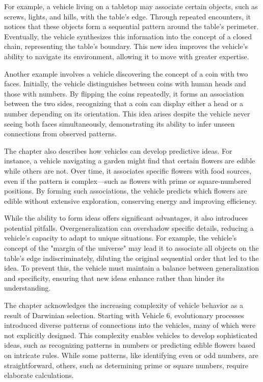 \documentclass{article}
\begin{document}
	For example, a vehicle living on a tabletop may associate certain objects, such as screws, lights, and hills, with the table's edge. Through repeated encounters, it notices that these objects form a sequential pattern around the table's perimeter. Eventually, the vehicle synthesizes this information into the concept of a closed chain, representing the table's boundary. This new idea improves the vehicle's ability to navigate its environment, allowing it to move with greater expertise.

	Another example involves a vehicle discovering the concept of a coin with two faces. Initially, the vehicle distinguishes between coins with human heads and those with numbers. By flipping the coins repeatedly, it forms an association between the two sides, recognizing that a coin can display either a head or a number depending on its orientation. This idea arises despite the vehicle never seeing both faces simultaneously, demonstrating its ability to infer unseen connections from observed patterns.

	The chapter also describes how vehicles can develop predictive ideas. For instance, a vehicle navigating a garden might find that certain flowers are edible while others are not. Over time, it associates specific flowers with food sources, even if the pattern is complex—such as flowers with prime or square-numbered positions. By forming such associations, the vehicle predicts which flowers are edible without extensive exploration, conserving energy and improving efficiency.

	While the ability to form ideas offers significant advantages, it also introduces potential pitfalls. Overgeneralization can overshadow specific details, reducing a vehicle’s capacity to adapt to unique situations. For example, the vehicle’s concept of the "margin of the universe" may lead it to associate all objects on the table's edge indiscriminately, diluting the original sequential order that led to the idea. To prevent this, the vehicle must maintain a balance between generalization and specificity, ensuring that new ideas enhance rather than hinder its understanding.

	The chapter acknowledges the increasing complexity of vehicle behavior as a result of Darwinian selection. Starting with Vehicle 6, evolutionary processes introduced diverse patterns of connections into the vehicles, many of which were not explicitly designed. This complexity enables vehicles to develop sophisticated ideas, such as recognizing patterns in numbers or predicting edible flowers based on intricate rules. While some patterns, like identifying even or odd numbers, are straightforward, others, such as determining prime or square numbers, require elaborate calculations.
\end{document}
